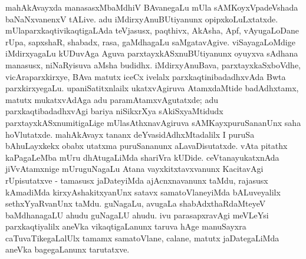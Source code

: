 mahAkAvayxda manasasxMbaMdhiV BAvanegaLu mUla sAMKoyxVpadeVshada baNaNx\-vanenxV tALive. adu iMdirxyAnuBUtiyanunx opipxkoLuLxtatxde. mUlaparxkaqtivikaqtigaLAda teVjasusx, paqthivx, AkAsha, Apf, vAyugaLoDane rUpa, sapxshaR, shabadx, rasa, gaMdhagaLu saMgatavAgive. viSayagaLoMdige iMdirxyagaLu kUDuvAga Aguva parxtayxkASxnu\-BUtiyanunx oyuyxva sAdhana manasusx, niNaRyisuva aMsha budidhx. iMdirxyAnuBava, parxtayxkaSxboVdhe, vicAraparxkirxye, BAva matutx iceCx ivelalx parxkaqtinibadadhxvAda Bwta parxkirxyegaLu. upaniSatitxnlailx ukatxvAgiruva AtamxdaMtide badAdhxtamx, matutx mukatxvAdAga adu paramAtamxvAgutatxde; adu parxkaqtibadadhxvAgi bariya niSikxrXya sAkiSxyaMtidudx parxtayxkASxnumitigaLige mUlasAthxnavAgiruva sAMKayxpuruSananUnx saha hoVlutatxde. mahAkAvayx tananx deYvasidAdhxMtadalilx I puruSa bAhuLayxkekx obabx utatxma puruSananunx aLavaDisutatxde. vAta pitathx kaPagaLeMba mUru dhAtugaLiMda shariVra kUDide. ceVtanayukatxnAda jiVvAtamxnige mUruguNagaLu Atana vayxkitxtavxvanunx KacitavAgi rUpisutatxve - tamasusx jaDateyiMda ajAcnxnavanunx taMdu, rajasusx kAmadiMda kirxyAshakitxyanUnx satavx samatoVlaneyiMda bALuveyalilx sethxYyaRvanUnx taMdu. guNagaLu, avugaLa shabAdxthaRdaMteyeV baMdhanagaLU ahudu guNagaLU ahudu. ivu parasapxravAgi meVLeYsi parxkaqtiyalilx aneVka vikaqtigaLanunx taruva hAge manuSayxra caTuvaTikegaLalUlx tamamx samatoVlane, calane, matutx jaDategaLiMda aneVka bagegaLanunx tarutatxve.

